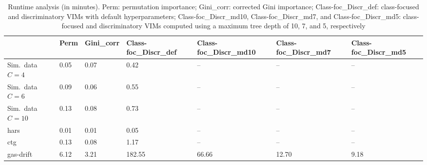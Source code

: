 \begin{table}[ht]
\scriptsize
\centering
\caption{Runtime analysis (in minutes). Perm: permutation importance; Gini\_corr: corrected Gini importance; Class-foc\_Discr\_def: class-focused and discriminatory VIMs with default hyperparameters; Class-foc\_Discr\_md10, Class-foc\_Discr\_md7, and Class-foc\_Discr\_md5: class-focused and discriminatory VIMs computed using a maximum tree depth of 10, 7, and 5, respectively}
\label{tab:runtime_analysis}
\begin{tabular}{p{1.2cm} p{1.3cm} p{1.3cm} p{1.9cm} p{1.9cm} p{1.9cm} p{1.9cm}}
\hline
 & Perm & Gini\_corr & Class-foc\_Discr\_def & Class-foc\_Discr\_md10 & Class-foc\_Discr\_md7 & Class-foc\_Discr\_md5 \\
\hline
Sim.\ data $C=4$ & 0.05 & 0.07 & 0.42 & -- & -- & -- \\[8pt]
Sim.\ data $C=6$ & 0.09 & 0.06 & 0.55 & -- & -- & -- \\[8pt]
Sim.\ data $C=10$ & 0.13 & 0.08 & 0.73 & -- & -- & -- \\[8pt]
hars & 0.01 & 0.01 & 0.05 & -- & -- & -- \\[8pt]
ctg & 0.13 & 0.08 & 1.17 & -- & -- & -- \\[8pt]
gas-drift &   6.12 &   3.21 & 182.55 & 66.66 & 12.70 &  9.18 \\[8pt]
\end{tabular}
\end{table}
